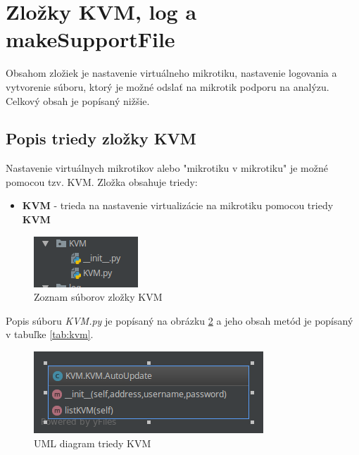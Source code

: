 \section{Zložky KVM, log a makeSupportFile}
Obsahom zložiek je nastavenie virtuálneho mikrotiku, nastavenie logovania a vytvorenie súboru, ktorý je možné odslať na mikrotik podporu na analýzu. Celkový obsah je popísaný nižšie.
\subsection{Popis triedy zložky KVM}
Nastavenie virtuálnych mikrotikov alebo "mikrotiku v mikrotiku" je možné pomocou tzv. KVM. Zložka obsahuje triedy:\begin{itemize}
\item \textbf{KVM} - trieda na nastavenie virtualizácie na mikrotiku pomocou triedy \textbf{KVM}
\end{itemize}
\begin{figure}[H]
\centering
\includegraphics[scale=0.6]{../text/kvm.png}
\caption{Zoznam súborov zložky KVM}
\label{fig:mangle}
\end{figure}
Popis súboru \textit{KVM.py} je popísaný na obrázku \ref{fig:kvm}  a jeho obsah metód je popísaný v tabuľke \ref{tab:kvm}.
\begin{table}[H]
\caption{Tabuľka metód triedy KVM}
\label{tab:kvm}
\end{table}
\begin{figure}[H]
\centering
\includegraphics[scale=0.6]{../text/kvmfig.png}
\caption{UML diagram triedy KVM}
\label{fig:kvm}
\end{figure}
